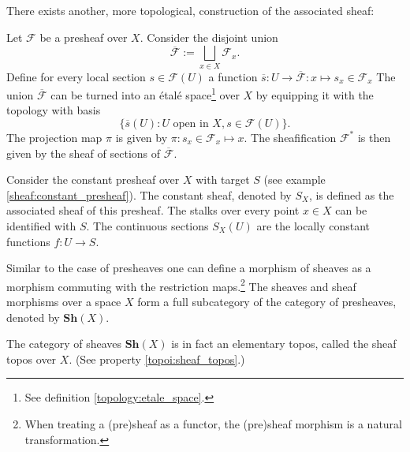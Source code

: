     There exists another, more topological, construction of the associated sheaf:
    \begin{construct}\label{sheaf:etale_construction}
        Let $\mathcal{F}$ be a presheaf over $X$. Consider the disjoint union
        \begin{equation}
            \overline{\mathcal{F}} := \bigsqcup_{x\in X}\mathcal{F}_x.
        \end{equation}
        Define for every local section $s\in\mathcal{F}(U)$ a function $\overline{s}:U\rightarrow\overline{\mathcal{F}}:x\mapsto s_x\in\mathcal{F}_x$ The union $\overline{\mathcal{F}}$ can be turned into an \'etal\'e space\footnote{See definition \ref{topology:etale_space}.} over $X$ by equipping it with the topology with basis
        \begin{equation}
            \big\{\overline{s}(U):U\text{ open in }X, s\in\mathcal{F}(U)\big\}.
        \end{equation}
        The projection map $\pi$ is given by $\pi:s_x\in\mathcal{F}_x\mapsto x$. The sheafification $\mathcal{F}^\ast$ is then given by the sheaf of sections of $\overline{\mathcal{F}}$.
    \end{construct}

    \begin{example}
        Consider the constant presheaf over $X$ with target $S$ (see example \ref{sheaf:constant_presheaf}). The constant sheaf, denoted by $S_X$, is defined as the associated sheaf of this presheaf. The stalks over every point $x\in X$ can be identified with $S$. The continuous sections $S_X(U)$ are the locally constant functions $f:U\rightarrow S$.
    \end{example}

    \begin{notation}
        Similar to the case of presheaves one can define a morphism of sheaves as a morphism commuting with the restriction maps.\footnote{When treating a (pre)sheaf as a functor, the (pre)sheaf morphism is a natural transformation.} The sheaves and sheaf morphisms over a space $X$ form a full subcategory of the category of presheaves, denoted by $\mathbf{Sh}(X)$.
    \end{notation}

    \begin{property}
        The category of sheaves $\mathbf{Sh}(X)$ is in fact an elementary topos, called the sheaf topos over $X$. (See property \ref{topoi:sheaf_topos}.)
    \end{property}

